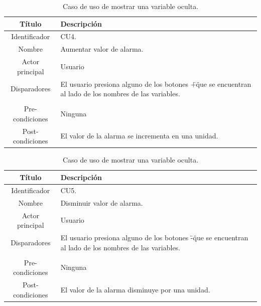 \begin{table}[htpb]
	\centering
	\caption{Caso de uso de mostrar una variable oculta.}
	\centering
	\begin{tabular}{c p{}}    
		\toprule
		\textbf{Título }     & \textbf{Descripción} \\
		\midrule
		Identificador		&	CU4. \\
		Nombre				& 	Aumentar valor de alarma. \\
		Actor principal		&   Usuario \\
		Disparadores		&   El usuario presiona alguno de los botones \"+\" que se encuentran al lado de los nombres de las variables. \\
\\
		Pre-condiciones		&   Ninguna \\
		Post-condiciones	&   El valor de la alarma se incrementa en una unidad.\\
		\bottomrule
	\end{tabular}
\label{tab:caso-aumentar}
\end{table}

\begin{table}[htpb]
	\centering
	\caption{Caso de uso de mostrar una variable oculta.}
	\centering
	\begin{tabular}{c p{}}    
		\toprule
		\textbf{Título }     & \textbf{Descripción} \\
		\midrule
		Identificador		&	CU5. \\
		Nombre				& 	Disminuir valor de alarma. \\
		Actor principal		&   Usuario \\
		Disparadores		&   El usuario presiona alguno de los botones \"-\" que se encuentran al lado de los nombres de las variables. \\
\\
		Pre-condiciones		&   Ninguna \\
		Post-condiciones	&   El valor de la alarma disminuye por una unidad.\\
		\bottomrule
	\end{tabular}
\label{tab:caso-decrementar}
\end{table}

